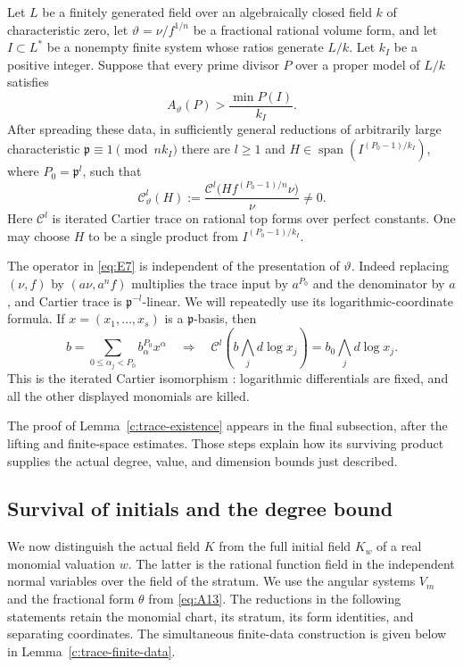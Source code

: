 \begin{lemma}\label{c:trace-existence}
Let $L$ be a finitely generated field over an algebraically closed field $k$
of characteristic zero, let
$\vartheta=\nu/f^{1/n}$ be a fractional rational volume form, and let
$I\subset L^*$ be a nonempty finite system whose ratios generate $L/k$.
Let $k_I$ be a positive integer.  Suppose that every prime divisor $P$ over
a proper model of $L/k$ satisfies
\begin{equation}\label{eq:E6}
 A_\vartheta(P)>\frac{\min P(I)}{k_I}.
\end{equation}
After spreading these data, in sufficiently general reductions of arbitrarily
large characteristic $\mathfrak p\equiv1\pmod{nk_I}$ there are $l\ge1$ and
$H\in\operatorname{span}(I^{(P_0-1)/k_I})$, where $P_0=\mathfrak p^l$, such that
\begin{equation}\label{eq:E7}
 \mathcal C^l_\vartheta(H)
 :=\frac{\mathcal C^l\bigl(Hf^{(P_0-1)/n}\nu\bigr)}{\nu}\ne0.
\end{equation}
Here $\mathcal C^l$ is iterated Cartier trace on rational top forms over
perfect constants.  One may choose $H$ to be a single product from
$I^{(P_0-1)/k_I}$.
\end{lemma}

The operator in \eqref{eq:E7} is independent of the presentation of
$\vartheta$.  Indeed replacing $(\nu,f)$ by $(a\nu,a^nf)$ multiplies the
trace input by $a^{P_0}$ and the denominator by $a$, and Cartier trace is
$\mathfrak p^{-l}$-linear.  We will repeatedly use its logarithmic-coordinate formula.
If $x=(x_1,\ldots,x_s)$ is a $\mathfrak p$-basis, then
\[
 b=\sum_{0\le\alpha_j<P_0}b_\alpha^{P_0}x^\alpha
 \quad\Longrightarrow\quad
 \mathcal C^l\left(b\bigwedge_jd\log x_j\right)
     =b_0\bigwedge_jd\log x_j.
\]
This is the iterated Cartier isomorphism
\cite[Th\'eor\`eme~1]{Cartier1957}: logarithmic differentials are
fixed, and all the other displayed monomials are killed.

The proof of Lemma~\ref{c:trace-existence} appears in the final
subsection, after the lifting and finite-space estimates.  Those steps
explain how its surviving product supplies
the actual degree, value, and dimension bounds just described.


\subsection{Survival of initials and the degree bound}

We now distinguish the actual field $K$ from the full initial field $K_w$
of a real monomial valuation $w$.  The latter is the rational function
field in the independent normal variables over the field of the stratum.
We use the angular systems $V_m$ and the fractional form $\theta$ from
\eqref{eq:A13}.  The reductions in the following statements retain the
monomial chart, its stratum, its form identities, and separating coordinates.
The simultaneous finite-data construction is given below in
Lemma~\ref{c:trace-finite-data}.

